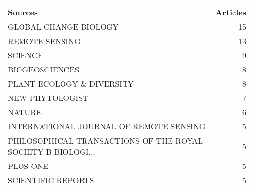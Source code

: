 
\begin{tabular}{lr}
\toprule
Sources & Articles\\
\midrule
GLOBAL CHANGE BIOLOGY & 15\\
REMOTE SENSING & 13\\
SCIENCE & 9\\
BIOGEOSCIENCES & 8\\
PLANT ECOLOGY \& DIVERSITY & 8\\
\addlinespace
NEW PHYTOLOGIST & 7\\
NATURE & 6\\
INTERNATIONAL JOURNAL OF REMOTE SENSING & 5\\
PHILOSOPHICAL TRANSACTIONS OF THE ROYAL SOCIETY B-BIOLOGI... & 5\\
PLOS ONE & 5\\
\addlinespace
SCIENTIFIC REPORTS & 5\\
\bottomrule
\end{tabular}